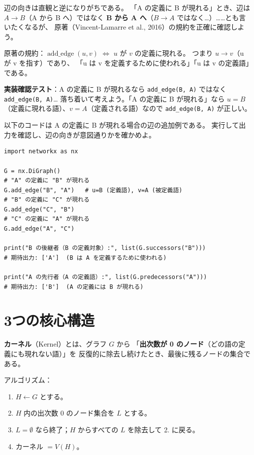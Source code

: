 \documentclass[lang=jp, color=black, mode=simple, 11pt]{elegantbook}
\begin{document}
\begin{caution}
  辺の向きは直観と逆になりがちである。
  「A の定義に B が現れる」とき、辺は $A \to B$（A から B へ）ではなく
  \textbf{B から A へ}（$B \to A$ ではなく…）……とも言いたくなるが、
  原著（Vincent-Lamarre et al., 2016）の規約を正確に確認しよう。

  \medskip
  原著の規約：$\operatorname{add\_edge}(u, v)$ $\Leftrightarrow$ $u$ が $v$ の定義に現れる。
  つまり $u \to v$（u が v を指す）であり、
  「u は v を定義するために使われる」「u は v の定義語」である。

  \medskip
  \textbf{実装確認テスト}：A の定義に B が現れるなら \texttt{add\_edge(B, A)} ではなく
  \texttt{add\_edge(B, A)}…
  落ち着いて考えよう。「A の定義に B が現れる」なら
  $u = B$（定義に現れる語）、$v = A$（定義される語）なので
  \texttt{add\_edge(B, A)} が正しい。
\end{caution}

\begin{tryit}[辺の方向を確認する]
以下のコードは A の定義に B が現れる場合の辺の追加例である。
実行して出力を確認し、辺の向きが意図通りかを確かめよ。
\begin{lstlisting}[caption=辺の方向チェック]
import networkx as nx

G = nx.DiGraph()
# "A" の定義に "B" が現れる
G.add_edge("B", "A")   # u=B (定義語), v=A (被定義語)
# "B" の定義に "C" が現れる
G.add_edge("C", "B")
# "C" の定義に "A" が現れる
G.add_edge("A", "C")

print("B の後継者（B の定義対象）:", list(G.successors("B")))
# 期待出力: ['A']  (B は A を定義するために使われる)

print("A の先行者（A の定義語）:", list(G.predecessors("A")))
# 期待出力: ['B']  (A の定義には B が現れる)
\end{lstlisting}
\end{tryit}

\section{3つの核心構造}

\begin{definition}[カーネル]
  \textbf{カーネル}（Kernel）とは、グラフ $G$ から
  「\textbf{出次数が 0 のノード}（どの語の定義にも現れない語）」を
  反復的に除去し続けたとき、最後に残るノードの集合である。

  \medskip
  アルゴリズム：
  \begin{enumerate}
    \item $H \leftarrow G$ とする。
    \item $H$ 内の出次数 0 のノード集合を $L$ とする。
    \item $L = \emptyset$ なら終了；$H$ からすべての $L$ を除去して 2. に戻る。
    \item カーネル $= V(H)$。
  \end{enumerate}
\end{definition}
\end{document}
